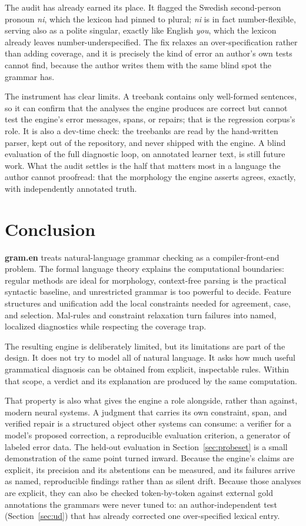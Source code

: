 \documentclass[11pt]{article}
\theoremstyle{definition}
\theoremstyle{plain}
\theoremstyle{remark}
\newcommand{\Gram}{\textbf{gram.en}}
\begin{document}
The audit has already earned its place. It flagged the Swedish second-person pronoun
\emph{ni}, which the lexicon had pinned to plural; \emph{ni} is in fact number-flexible,
serving also as a polite singular, exactly like English \emph{you}, which the lexicon
already leaves number-underspecified. The fix relaxes an over-specification rather than
adding coverage, and it is precisely the kind of error an author's own tests cannot find,
because the author writes them with the same blind spot the grammar has.

The instrument has clear limits. A treebank contains only well-formed sentences, so it can
confirm that the analyses the engine produces are correct but cannot test the engine's
error messages, spans, or repairs; that is the regression corpus's role. It is also a
dev-time check: the treebanks are read by the hand-written parser, kept out of the
repository, and never shipped with the engine. A blind evaluation of the full diagnostic
loop, on annotated learner text, is still future work. What the audit settles is the half
that matters most in a language the author cannot proofread: that the morphology the engine
asserts agrees, exactly, with independently annotated truth.

\section{Conclusion}

\Gram{} treats natural-language grammar checking as a compiler-front-end problem. The formal
language theory explains the computational boundaries: regular methods are ideal for morphology,
context-free parsing is the practical syntactic baseline, and unrestricted grammar is too
powerful to decide. Feature structures and unification add the local constraints needed for
agreement, case, and selection. Mal-rules and constraint relaxation turn failures into named,
localized diagnostics while respecting the coverage trap.

The resulting engine is deliberately limited, but its limitations are part of the design. It does
not try to model all of natural language. It asks how much useful grammatical diagnosis can be
obtained from explicit, inspectable rules. Within that scope, a verdict and its explanation
are produced by the same computation.

That property is also what gives the engine a role alongside, rather than against,
modern neural systems. A judgment that carries its own constraint, span, and verified
repair is a structured object other systems can consume: a verifier for a model's
proposed correction, a reproducible evaluation criterion, a generator of labeled error
data. The held-out evaluation in Section~\ref{sec:probeset} is a small demonstration of
the same point turned inward. Because the engine's claims are explicit, its precision
and its abstentions can be measured, and its failures arrive as named, reproducible
findings rather than as silent drift. Because those analyses are explicit, they can also be
checked token-by-token against external gold annotations the grammars were never tuned to:
an author-independent test (Section~\ref{sec:ud}) that has already corrected one
over-specified lexical entry.
\end{document}
